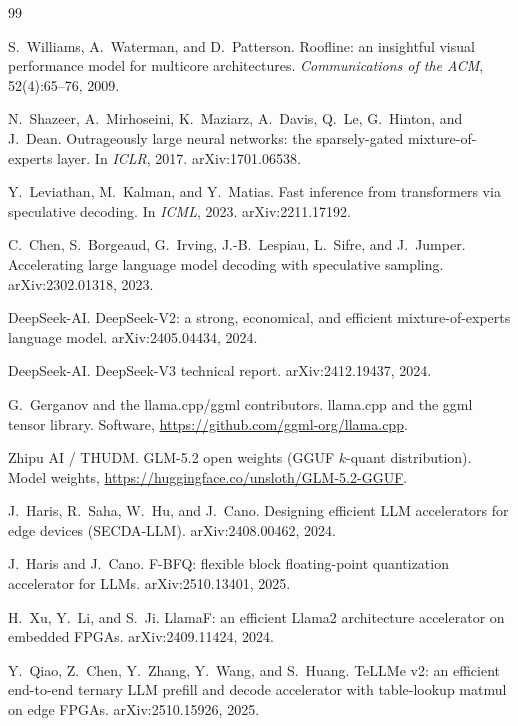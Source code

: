 \documentclass[11pt]{article}
\begin{document}
\begin{thebibliography}{99}

S.~Williams, A.~Waterman, and D.~Patterson.
\newblock Roofline: an insightful visual performance model for multicore
architectures.
\newblock \emph{Communications of the ACM}, 52(4):65--76, 2009.

N.~Shazeer, A.~Mirhoseini, K.~Maziarz, A.~Davis, Q.~Le, G.~Hinton, and J.~Dean.
\newblock Outrageously large neural networks: the sparsely-gated
mixture-of-experts layer.
\newblock In \emph{ICLR}, 2017. arXiv:1701.06538.

Y.~Leviathan, M.~Kalman, and Y.~Matias.
\newblock Fast inference from transformers via speculative decoding.
\newblock In \emph{ICML}, 2023. arXiv:2211.17192.

C.~Chen, S.~Borgeaud, G.~Irving, J.-B.~Lespiau, L.~Sifre, and J.~Jumper.
\newblock Accelerating large language model decoding with speculative sampling.
\newblock arXiv:2302.01318, 2023.

DeepSeek-AI.
\newblock DeepSeek-V2: a strong, economical, and efficient mixture-of-experts
language model.
\newblock arXiv:2405.04434, 2024.

DeepSeek-AI.
\newblock DeepSeek-V3 technical report.
\newblock arXiv:2412.19437, 2024.

G.~Gerganov and the llama.cpp/ggml contributors.
\newblock llama.cpp and the ggml tensor library.
\newblock Software, \url{https://github.com/ggml-org/llama.cpp}.

Zhipu AI / THUDM.
\newblock GLM-5.2 open weights (GGUF $k$-quant distribution).
\newblock Model weights, \url{https://huggingface.co/unsloth/GLM-5.2-GGUF}.

J.~Haris, R.~Saha, W.~Hu, and J.~Cano.
\newblock Designing efficient LLM accelerators for edge devices (SECDA-LLM).
\newblock arXiv:2408.00462, 2024.

J.~Haris and J.~Cano.
\newblock F-BFQ: flexible block floating-point quantization accelerator for
LLMs.
\newblock arXiv:2510.13401, 2025.

H.~Xu, Y.~Li, and S.~Ji.
\newblock LlamaF: an efficient Llama2 architecture accelerator on embedded
FPGAs.
\newblock arXiv:2409.11424, 2024.

Y.~Qiao, Z.~Chen, Y.~Zhang, Y.~Wang, and S.~Huang.
\newblock TeLLMe v2: an efficient end-to-end ternary LLM prefill and decode
accelerator with table-lookup matmul on edge FPGAs.
\newblock arXiv:2510.15926, 2025.


\end{thebibliography}
\end{document}
